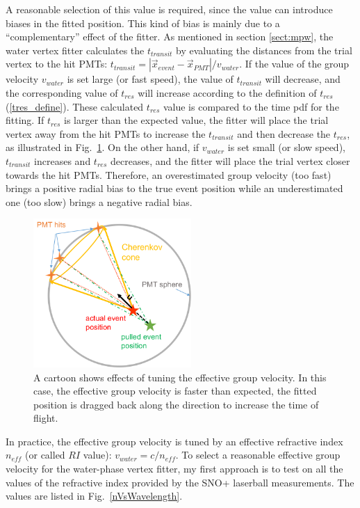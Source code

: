 A reasonable selection of this value is required, since the value can introduce biases in the fitted position. This kind of bias is mainly due to a ``complementary'' effect of the fitter. As mentioned in section \ref{sect:mpw}, the water vertex fitter calculates the $t_{transit}$ by evaluating the distances from the trial vertex to the hit PMTs: $t_{transit}=|\vec{x}_{event}-\vec{x}_{PMT}|/v_{water}$. If the value of the group velocity $v_{water}$ is set large (or fast speed), the value of $t_{transit}$ will decrease, and the corresponding value of $t_{res}$ will increase according to the definition of $t_{res}$(\ref{tres_define}). These calculated $t_{res}$ value is compared to the time pdf for the fitting. If $t_{res}$ is larger than the expected value, the fitter will place the trial vertex away from the 
hit PMTs to increase the $t_{transit}$ and then decrease the $t_{res}$, as illustrated in Fig.~\ref{effectiveVg}. On the other hand, if $v_{water}$ is set small (or slow speed), $t_{transit}$ increases and $t_{res}$ decreases, and the fitter will place the trial vertex closer towards the hit PMTs.
Therefore, an overestimated group velocity (too fast) brings a positive radial bias to the true event position while an underestimated one (too slow) brings a negative radial bias.
\begin{figure}[!htb]
	\centering
	\includegraphics[width=6cm]{effectOfGroupVelocity.png}
	\caption{A cartoon shows effects of tuning the effective group velocity. In this case, the effective group velocity is faster than expected, the fitted position is dragged back along the direction to increase the time of flight.}
	\label{effectiveVg}
\end{figure}

In practice, the effective group velocity is tuned by an effective refractive index $n_{eff}$ (or called $RI$ value): $v_{water}=c/n_{eff}$. To select a reasonable effective group velocity for the water-phase vertex fitter, my first approach is to test on all the values of the refractive index provided by the SNO+ laserball measurements. The values are listed in Fig.~\ref{nVsWavelength}. 


